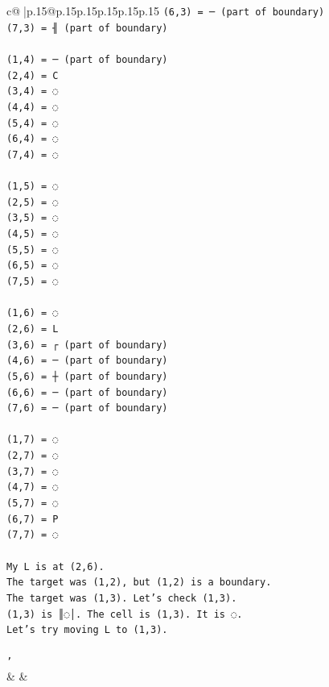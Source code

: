 \documentclass{article}
\begin{document}
{\begin{supertabular}{c@{$\;$}|p{.15\linewidth}@{}p{.15\linewidth}p{.15\linewidth}p{.15\linewidth}p{.15\linewidth}p{.15\linewidth}}
{{{\texttt{(6,3) = ─ (part of boundary)} \\
\texttt{(7,3) = ╢ (part of boundary)} \\
\\ 
\texttt{(1,4) = ─ (part of boundary)} \\
\texttt{(2,4) = C} \\
\texttt{(3,4) = ◌} \\
\texttt{(4,4) = ◌} \\
\texttt{(5,4) = ◌} \\
\texttt{(6,4) = ◌} \\
\texttt{(7,4) = ◌} \\
\\ 
\texttt{(1,5) = ◌} \\
\texttt{(2,5) = ◌} \\
\texttt{(3,5) = ◌} \\
\texttt{(4,5) = ◌} \\
\texttt{(5,5) = ◌} \\
\texttt{(6,5) = ◌} \\
\texttt{(7,5) = ◌} \\
\\ 
\texttt{(1,6) = ◌} \\
\texttt{(2,6) = L} \\
\texttt{(3,6) = ┌ (part of boundary)} \\
\texttt{(4,6) = ─ (part of boundary)} \\
\texttt{(5,6) = ┼ (part of boundary)} \\
\texttt{(6,6) = ─ (part of boundary)} \\
\texttt{(7,6) = ─ (part of boundary)} \\
\\ 
\texttt{(1,7) = ◌} \\
\texttt{(2,7) = ◌} \\
\texttt{(3,7) = ◌} \\
\texttt{(4,7) = ◌} \\
\texttt{(5,7) = ◌} \\
\texttt{(6,7) = P} \\
\texttt{(7,7) = ◌} \\
\\ 
\texttt{My L is at (2,6).} \\
\texttt{The target was (1,2), but (1,2) is a boundary.} \\
\texttt{The target was (1,3). Let's check (1,3).} \\
\texttt{(1,3) is ║◌│. The cell is (1,3). It is ◌.} \\
\texttt{Let's try moving L to (1,3).} \\
\\ 
\texttt{'} \\
            }
        }
    }
    & & \\ \\


\end{supertabular}}
\end{document}
